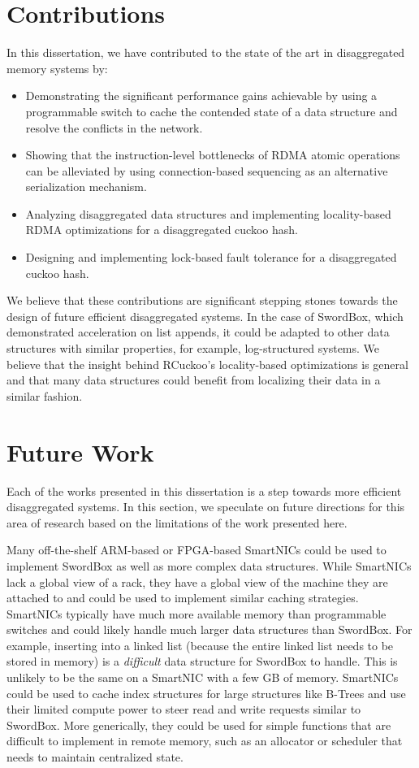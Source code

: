 \documentclass[12pt]{ucsddissertation}
\newcommand{\sword}{SwordBox}
\begin{document}
\section{Contributions}

In this dissertation, we have contributed to the state of the art in disaggregated memory systems by:

\begin{itemize}
    \item Demonstrating the significant performance gains achievable by using a programmable switch to cache the contended state of a data structure and resolve the conflicts in the network.
    \item Showing that the instruction-level bottlenecks of RDMA atomic operations can be alleviated by using connection-based sequencing as an alternative serialization mechanism.
    \item Analyzing disaggregated data structures and implementing locality-based RDMA optimizations for a disaggregated cuckoo hash.
    \item Designing and implementing lock-based fault tolerance for a disaggregated cuckoo hash.
\end{itemize}

We believe that these contributions are significant stepping stones towards the design of future
efficient disaggregated systems. In the case of {\sword}, which demonstrated acceleration on
list appends, it could be adapted to other data structures with similar properties, for example,
log-structured systems. We believe that the insight behind RCuckoo's locality-based optimizations is
general and that many data structures could benefit from localizing their data in a similar fashion.

\section{Future Work}


Each of the works presented in this dissertation is a step towards more efficient disaggregated
systems. In this section, we speculate on future directions for this area of research based on the
limitations of the work presented here.

Many off-the-shelf ARM-based or FPGA-based SmartNICs could be used to implement {\sword} as well as
more complex data structures. While SmartNICs lack a global view of a rack, they have a global view
of the machine they are attached to and could be used to implement similar caching strategies.
SmartNICs typically have much more available memory than programmable switches and could likely
handle much larger data structures than {\sword}. For example, inserting into a linked list (because
the entire linked list needs to be stored in memory) is a \textit{difficult} data structure for
{\sword} to handle. This is unlikely to be the same on a SmartNIC with a few GB of memory. SmartNICs
could be used to cache index structures for large structures like B-Trees and use their limited
compute power to steer read and write requests similar to {\sword}. More generically, they could be
used for simple functions that are difficult to implement in remote memory, such as an allocator or
scheduler that needs to maintain centralized state.
\end{document}
